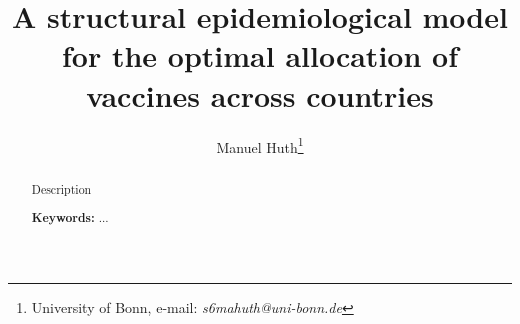 
\title{A structural epidemiological model for the optimal allocation of vaccines across countries}

\author{Manuel Huth\thanks{University of Bonn, e-mail: \textit{s6mahuth@uni-bonn.de}}}

\maketitle

\sloppy

\singlespacing

\begin{abstract}

\noindent
Description




\strut

\noindent \textbf{Keywords:} ... \\

\end{abstract}

\thispagestyle{empty}

\clearpage
\onehalfspacing
